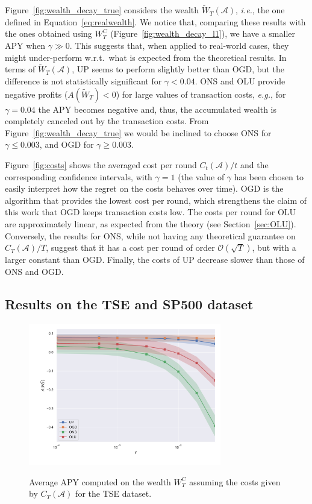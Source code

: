 Figure~\ref{fig:wealth_decay_true} considers the wealth $\tilde{W}_T(\mathcal{A})$, \emph{i.e.}, the one defined in Equation~\eqref{eq:realwealth}.
We notice that, comparing these results with the ones obtained using $W_T^C$ (Figure~\ref{fig:wealth_decay_l1}), we have a smaller APY when $\gamma \gg 0$.
This suggests that, when applied to real-world cases, they might under-perform w.r.t.~what is expected from the theoretical results. 
In terms of $\tilde{W}_T(\mathcal{A})$, UP seems to perform slightly better than OGD, but the difference is not statistically significant for $\gamma < 0.04$.
ONS and OLU provide negative profits ($A(\tilde{W}_T) < 0$) for large values of transaction costs, \emph{e.g.}, for $\gamma = 0.04$ the APY becomes negative and, thus, the accumulated wealth is completely canceled out by the transaction costs.
From Figure~\ref{fig:wealth_decay_true} we would be inclined to choose ONS for $\gamma \leq 0.003$, and OGD for $\gamma \geq 0.003$.

Figure~\ref{fig:costs} shows the averaged cost per round $C_t(\mathcal{A})/t$ and the corresponding confidence intervals, with $\gamma = 1$ (the value of $\gamma$ has been chosen to easily interpret how the regret on the costs behaves over time).
OGD is the algorithm that provides the lowest cost per round, which strengthens the claim of this work that OGD keeps transaction costs low.
The costs per round for OLU are approximately linear, as expected from the theory (see Section~\ref{sec:OLU}).
Conversely, the results for ONS, while not having any theoretical guarantee on $C_T(\mathcal{A})/T$, suggest that it has a cost per round of order $\mathcal{O}(\sqrt{T})$, but with a larger constant than OGD.
Finally, the costs of UP decrease slower than those of ONS and OGD.

\subsection{Results on the TSE and SP500 dataset}

\begin{figure}[ht!]
\centering
{\includegraphics[width=0.75\textwidth,keepaspectratio]{img/fig_w_decay_l1_tse.pdf}} 
\caption{Average APY computed on the wealth $W_T^C$ assuming the costs given by $C_T(\mathcal{A})$ for the TSE dataset.}
\label{fig:wealth_decay_l1_tse}
\end{figure}


